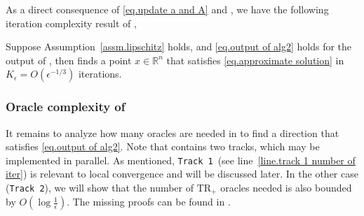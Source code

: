 \documentclass{mcom-l}
\newcommand{\cz}[1]{{\color{rosemary}\sffamily [#1]}}
\newcommand{\trp}{\textrm{TR}_+}
\numberwithin{equation}{section}
\begin{document}
As a direct consequence of \eqref{eq.update a and A} and , we have the following iteration complexity result of ,
\begin{theorem}
    \label{thm.convergence outer loop}
    Suppose Assumption~\ref{assm.lipschitz} holds, and \eqref{eq.output of alg2} holds for the output of , then  finds a point $x\in\mathbb{R}^n$ that satisfies \eqref{eq.approximate solution} in $K_\epsilon=O(\epsilon^{-1/3})$ iterations.
\end{theorem}

\subsubsection{Oracle complexity of }
It remains to analyze how many oracles are needed in  to find a direction that satisfies \eqref{eq.output of alg2}. Note that  contains two tracks, which may be implemented in parallel. As mentioned, \texttt{Track 1}~(see line~\ref{line.track 1 number of iter}) is relevant to local convergence and will be discussed later.
In the other case (\texttt{Track 2}), we will show that the number of $\trp$ oracles needed is also bounded by $O(\log\tfrac1\epsilon)$. The missing proofs can be found in .
\end{document}
